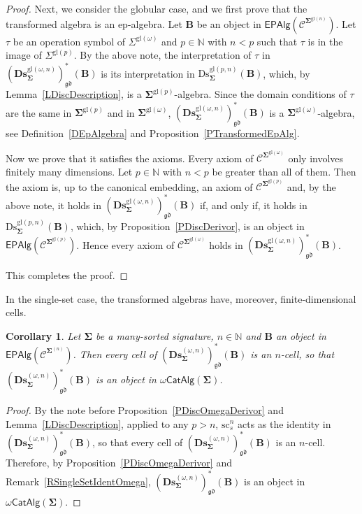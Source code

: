 \documentclass[a4paper, reqno
]{amsart}
\newcommand{\sig}[1]{\mathbf{#1}}             %
\newcommand{\spec}[1]{\boldsymbol{\mathcal{#1}}} %
\newcommand{\gd}{\mathfrak{gd}}              %
\newcommand{\gl}{\mathrm{gl}}                %
\newcommand{\src}{\mathrm{sc}}
\newcommand{\Ds}{\mathrm{Ds}}
\newcommand{\bDs}{\mathbf{Ds}}
\theoremstyle{plain}
\newtheorem{corollary}[theorem]{Corollary}
\theoremstyle{definition}
\begin{document}
\begin{proof}
Next, we consider the globular case, and we first prove that the transformed algebra is an ep-algebra.
Let $\mathbf{B}$ be an object in $\mathsf{EPAlg}(\spec{C}^{\sig{\Sigma}^{\gl(n)}})$.
Let $\tau$ be an operation symbol of $\Sigma^{\gl(\omega)}$ and $p\in\mathbb{N}$ with $n<p$ such that $\tau$ is in the image of $\Sigma^{\gl(p)}$.
By the above note, the interpretation of $\tau$ in $(\bDs^{\gl(\omega,n)}_{\sig{\Sigma}})^{\ast}_{\gd}(\mathbf{B})$ is its interpretation in $\Ds^{\gl(p,n)}_{\sig{\Sigma}}(\mathbf{B})$, which, by Lemma~\ref{LDiscDescription}, is a $\sig{\Sigma}^{\gl(p)}$-algebra.
Since the domain conditions of $\tau$ are the same in $\sig{\Sigma}^{\gl(p)}$ and in $\sig{\Sigma}^{\gl(\omega)}$, $(\bDs^{\gl(\omega,n)}_{\sig{\Sigma}})^{\ast}_{\gd}(\mathbf{B})$ is a $\sig{\Sigma}^{\gl(\omega)}$-algebra, see Definition~\ref{DEpAlgebra} and Proposition~\ref{PTransformedEpAlg}.

Now we prove that it satisfies the axioms.
Every axiom of $\spec{C}^{\sig{\Sigma}^{\gl(\omega)}}$ only involves finitely many dimensions.
Let $p\in\mathbb{N}$ with $n<p$ be greater than all of them.
Then the axiom is, up to the canonical embedding, an axiom of $\spec{C}^{\sig{\Sigma}^{\gl(p)}}$ and, by the above note, it holds in $(\bDs^{\gl(\omega,n)}_{\sig{\Sigma}})^{\ast}_{\gd}(\mathbf{B})$ if, and only if, it holds in $\Ds^{\gl(p,n)}_{\sig{\Sigma}}(\mathbf{B})$, which, by Proposition~\ref{PDiscDerivor}, is an object in $\mathsf{EPAlg}(\spec{C}^{\sig{\Sigma}^{\gl(p)}})$.
Hence every axiom of $\spec{C}^{\sig{\Sigma}^{\gl(\omega)}}$ holds in $(\bDs^{\gl(\omega,n)}_{\sig{\Sigma}})^{\ast}_{\gd}(\mathbf{B})$.

This completes the proof.
\end{proof}

In the single-set case, the transformed algebras have, moreover, finite-dimensional cells.

\begin{corollary}\label{CDiscOmegaDerivor}
Let $\sig{\Sigma}$ be a many-sorted signature, $n\in\mathbb{N}$ and $\mathbf{B}$ an object in $\mathsf{EPAlg}(\spec{C}^{\sig{\Sigma}^{(n)}})$.
Then every cell of $(\bDs^{(\omega,n)}_{\sig{\Sigma}})^{\ast}_{\gd}(\mathbf{B})$ is an $n$-cell, so that $(\bDs^{(\omega,n)}_{\sig{\Sigma}})^{\ast}_{\gd}(\mathbf{B})$ is an object in $\omega\mathsf{CatAlg}(\sig{\Sigma})$.
\end{corollary}
\begin{proof}
By the note before Proposition~\ref{PDiscOmegaDerivor} and Lemma~\ref{LDiscDescription}, applied to any $p>n$, $\src^{n}_{s}$ acts as the identity in $(\bDs^{(\omega,n)}_{\sig{\Sigma}})^{\ast}_{\gd}(\mathbf{B})$, so that every cell of $(\bDs^{(\omega,n)}_{\sig{\Sigma}})^{\ast}_{\gd}(\mathbf{B})$ is an $n$-cell.
Therefore, by Proposition~\ref{PDiscOmegaDerivor} and Remark~\ref{RSingleSetIdentOmega}, $(\bDs^{(\omega,n)}_{\sig{\Sigma}})^{\ast}_{\gd}(\mathbf{B})$ is an object in $\omega\mathsf{CatAlg}(\sig{\Sigma})$.
\end{proof}
\end{document}
